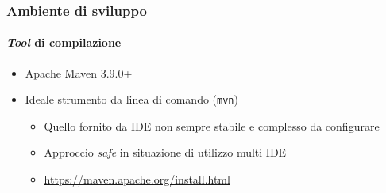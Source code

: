 \begin{frame}[t,fragile] \frametitle{Ambiente di sviluppo}
\framesubtitle{\textit{Tool} di compilazione}
    \begin{itemize}[leftmargin=20pt,align=right]
        \item[\alert{\faArrowCircleRight}] Apache Maven \alert{3.9.0+}
        \item[\alert{\faArrowCircleRight}] Ideale strumento da \alert{linea di comando} (\texttt{mvn})
        \begin{itemize}[leftmargin=20pt,align=right]
            \item[\alert{\faArrowCircleRight}] Quello fornito da IDE non sempre stabile e complesso da configurare
            \item[\alert{\faArrowCircleRight}] Approccio \textit{safe} in situazione di utilizzo multi IDE
            \item[\alert{\faExternalLinkSquare}] \href{https://maven.apache.org/install.html}{https://maven.apache.org/install.html}
        \end{itemize}
    \end{itemize}
\end{frame}
%
